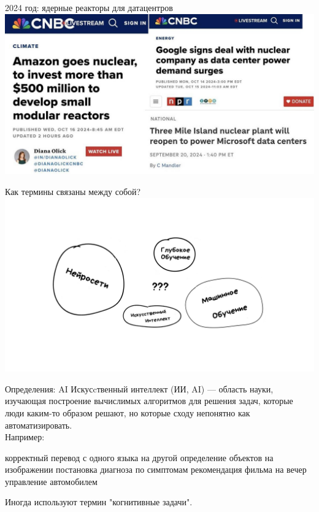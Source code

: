\documentclass[aspectratio=169, professionalfonts]{beamer}
\begin{document}
\begin{frame}{2024 год: ядерные реакторы для датацентров}
    \centering
    \includegraphics[width=.85\linewidth]{figures/fig2-news.jpg}
\end{frame}

\begin{frame}{Как термины связаны между собой?}
    \centering
    \includegraphics[width=.85\linewidth]{figures/fig3-terms.jpg}
\end{frame}

\begin{frame}{Определения: AI}
    Искусcтвенный интеллект (ИИ, AI) --- область науки, изучающая построение вычислимых
    алгоритмов для решения задач, которые люди каким-то образом решают,
    но которые сходу непонятно как автоматизировать.\\
    Например:
    \begin{outline}
        \1 корректный перевод с одного языка на другой
        \1 определение объектов на изображении
        \1 постановка диагноза по симптомам
        \1 рекомендация фильма на вечер
        \1 управление автомобилем
    \end{outline}

    Иногда используют термин "когнитивные задачи".
\end{frame}
\end{document}

